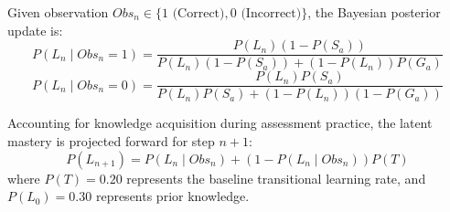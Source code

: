 \documentclass[journal]{IEEEtran}
\begin{document}
Given observation $Obs_n \in \{1 \text{ (Correct)}, 0 \text{ (Incorrect)}\}$, the Bayesian posterior update is:
\begin{equation}
P(L_n \mid Obs_n = 1) = \frac{P(L_n)(1 - P(S_a))}{P(L_n)(1 - P(S_a)) + (1 - P(L_n))P(G_a)}
\label{eq_bkt_correct}
\end{equation}
\begin{equation}
P(L_n \mid Obs_n = 0) = \frac{P(L_n)P(S_a)}{P(L_n)P(S_a) + (1 - P(L_n))(1 - P(G_a))}
\label{eq_bkt_incorrect}
\end{equation}

Accounting for knowledge acquisition during assessment practice, the latent mastery is projected forward for step $n+1$:
\begin{equation}
P(L_{n+1}) = P(L_n \mid Obs_n) + (1 - P(L_n \mid Obs_n)) P(T)
\label{eq_bkt_project}
\end{equation}
where $P(T) = 0.20$ represents the baseline transitional learning rate, and $P(L_0) = 0.30$ represents prior knowledge.
\end{document}
